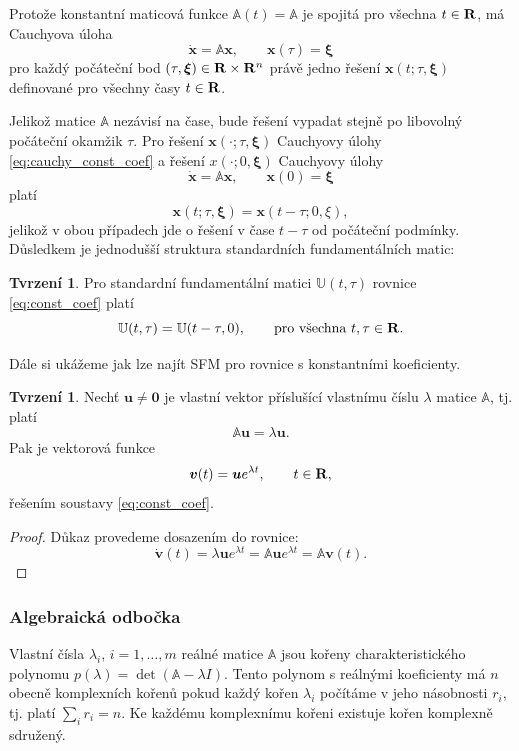 \documentclass[a4paper, 12pt]{book}
\theoremstyle{definition}
\newtheorem{proposition}[theorem]{Tvrzení}
\def\Real{{\rm\bf R}}
\def\vc#1{\mathbf{\boldsymbol{#1}}}     %
\def\tn#1{{\mathbb{#1}}}    %
\begin{document}
Protože konstantní maticová funkce $\tn A(t)=\tn A$ je spojitá pro všechna $t\in \Real$, má Cauchyova úloha
\begin{equation}
    \label{eq:cauchy_const_coef}
    \dot{\vc x} = {\tn A}\vc x,\qquad \vc x(\tau)=\vc\xi
\end{equation}
pro každý počáteční bod $(\tau,\vc\xi)\in \Real\times \Real^n$ právě jedno řešení 
$\vc x(t;\tau,\vc\xi)$ definované pro všechny časy $t\in \Real$. 

Jelikož matice $\tn A$ nezávisí na čase, bude řešení vypadat stejně po libovolný počáteční okamžik $\tau$. Pro řešení $\vc x(\cdot;\tau, \vc \xi)$ 
Cauchyovy úlohy \eqref{eq:cauchy_const_coef} a řešení $x(\cdot; 0, \vc \xi)$ Cauchyovy úlohy
    \begin{equation}
        \dot{\vc x} = {\tn A}\vc x,\qquad \vc x(0)=\vc\xi
    \end{equation}
platí
\[
   \vc x(t;\tau, \vc \xi) = \vc x(t - \tau; 0, \xi),
\]
jelikož v obou případech jde o řešení v čase $t - \tau$ od počáteční podmínky. Důsledkem je jednodušší struktura standardních fundamentálních matic:
\begin{proposition}

Pro standardní fundamentální matici $\tn U(t,\tau)$ rovnice \eqref{eq:const_coef}
platí
\[
    {\tn U}(t,\tau)={\tn U}(t-\tau,0),\qquad \text{pro všechna }t,\tau\in \Real.
\]
\end{proposition}

Dále si ukážeme jak lze najít SFM pro rovnice s konstantními koeficienty. 
\begin{proposition}
\label{prop:jedno_reseni}
Nechť $\vc u\ne \vc 0$ je vlastní vektor příslušící vlastnímu číslu $\lambda$ matice $\tn A$, tj. platí
\[
  \tn A \vc u = \lambda \vc u.
\]
Pak je vektorová funkce
\begin{equation}
\vc v(t)=\vc u e^{\lambda t},\qquad      t\in \Real,
\end{equation}
řešením soustavy \eqref{eq:const_coef}.
\end{proposition}
\begin{proof}
Důkaz provedeme dosazením do rovnice:
\[
  \dot{\vc v}(t) = \lambda \vc u e^{\lambda t} = \tn A \vc u e^{\lambda t} = \tn A \vc v(t).
\]
\end{proof}

\subsubsection{Algebraická odbočka}
Vlastní čísla $\lambda_i$, $i=1,\dots, m$ reálné matice $\tn A$ jsou kořeny charakteristického polynomu $p(\lambda) = \det(\tn A-\lambda I)$. 
Tento polynom s reálnými koeficienty má $n$ obecně komplexních kořenů pokud každý kořen $\lambda_i$ počítáme v jeho násobnosti $r_i$, tj. platí $\sum_i r_i = n$. 
Ke každému komplexnímu kořeni existuje kořen komplexně sdružený. 
\end{document}
